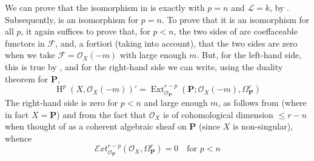 We can prove that the isomorphism in  is exactly  with $p=n$ and $\mathcal{L}=k$, by .
Subsequently,  is an isomorphism for $p=n$.
To prove that it is an isomorphism for all $p$, it again suffices to prove that, for $p<n$, the two sides of  are coeffaceable functors in $\mathcal{F}$, and, a fortiori (taking  into account), that the two sides are zero when we take $\mathcal{F}=\mathcal{O}_X(-m)$ with large enough $m$.
But, for the left-hand side, this is true by , and for the right-hand side we can write, using the duality theorem for $\mathbf{P}$,
\[\operatorname{H}^p(X,\mathcal{O}_X(-m))' = \operatorname{Ext}_{\mathcal{O}_\mathbf{P}}^{r-p}(\mathbf{P};\mathcal{O}_X(-m),\Omega_\mathbf{P}^r)\]
The right-hand side is zero for $p<n$ and large enough $m$, as follows from  (where in fact $X=\mathbf{P}$) and from the fact that $\mathcal{O}_X$ is of cohomological dimension $\leqslant r-n$ when thought of as a coherent algebraic sheaf on $\mathbf{P}$ (since $X$ is non-singular), whence
\[\mathcal{E}xt_{\mathcal{O}_\mathbf{P}}^{r-p}(\mathcal{O}_X,\Omega_\mathbf{P}^r) = 0 \quad\text{for }p<n\]
